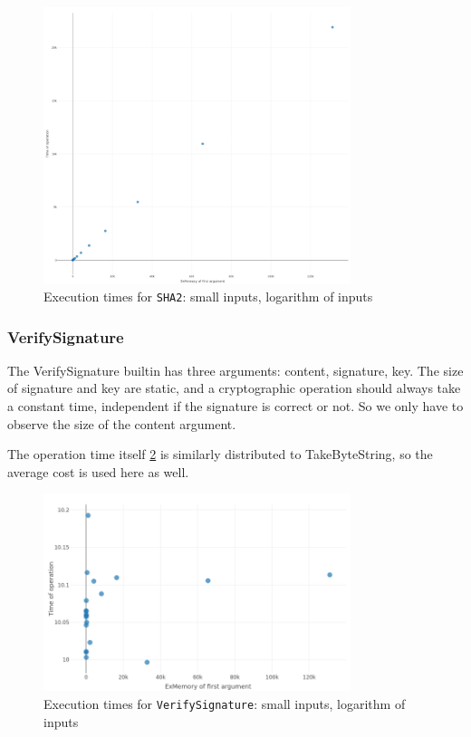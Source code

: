 \documentclass[a4paper]{article}
\begin{document}
\begin{figure}
\centering
  \includegraphics[width=0.8\textwidth]{figures/SHA2.png}
  \caption{Execution times for \texttt{SHA2}: small inputs, logarithm of inputs}
  \label{fig:SHA2}
\end{figure}

\subsubsection*{VerifySignature}

The VerifySignature builtin has three arguments: content, signature, key. The
size of signature and key are static, and a cryptographic operation should
always take a constant time, independent if the signature is correct or not. So
we only have to observe the size of the content argument.

The operation time itself \ref{fig:VerifySignature} is similarly distributed to
TakeByteString, so the average cost is used here as well. 

\begin{figure}
\centering
  \includegraphics[width=0.8\textwidth]{figures/VerifySignature.png}
  \caption{Execution times for \texttt{VerifySignature}: small inputs, logarithm of inputs}
  \label{fig:VerifySignature}
\end{figure}
\end{document}
